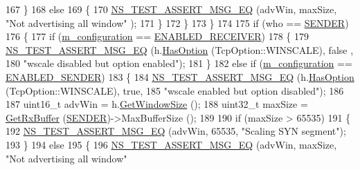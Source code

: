 \begin{DoxyCode}
167                 \}
168               \textcolor{keywordflow}{else}
169                 \{
170                   \hyperlink{group__testing_ga2a9d78cffb3db8e867c35fff0b698cf5}{NS\_TEST\_ASSERT\_MSG\_EQ} (advWin, maxSize, \textcolor{stringliteral}{"Not advertising all window"}
      );
171                 \}
172             \}
173         \}
174 
175       \textcolor{keywordflow}{if} (who == \hyperlink{classns3_1_1TcpGeneralTest_a29338e6b7137cad650c2ff835713f6eea5400e3d6b26928cf9e67ebb026462256}{SENDER})
176         \{
177           \textcolor{keywordflow}{if} (\hyperlink{classWScalingTestCase_a72831e1b3b682abc7055beee2e0022c1}{m\_configuration} == \hyperlink{classWScalingTestCase_a6b31fa8be505eaac47c2383fb17dc5fda2019990e4d73c728a156c14570c9feef}{ENABLED\_RECEIVER})
178             \{
179               \hyperlink{group__testing_ga2a9d78cffb3db8e867c35fff0b698cf5}{NS\_TEST\_ASSERT\_MSG\_EQ} (h.\hyperlink{classns3_1_1TcpHeader_aacc07bdab91925f1cddf9bcb1ae91d13}{HasOption} (TcpOption::WINSCALE), \textcolor{keyword}{false}
      ,
180                                      \textcolor{stringliteral}{"wscale disabled but option enabled"});
181             \}
182           \textcolor{keywordflow}{else} \textcolor{keywordflow}{if} (\hyperlink{classWScalingTestCase_a72831e1b3b682abc7055beee2e0022c1}{m\_configuration} == \hyperlink{classWScalingTestCase_a6b31fa8be505eaac47c2383fb17dc5fda605d0a930221d4226dfee3e4c89b47a3}{ENABLED\_SENDER})
183             \{
184               \hyperlink{group__testing_ga2a9d78cffb3db8e867c35fff0b698cf5}{NS\_TEST\_ASSERT\_MSG\_EQ} (h.\hyperlink{classns3_1_1TcpHeader_aacc07bdab91925f1cddf9bcb1ae91d13}{HasOption} (TcpOption::WINSCALE), \textcolor{keyword}{true},
185                                      \textcolor{stringliteral}{"wscale enabled but option disabled"});
186 
187               uint16\_t advWin = h.\hyperlink{classns3_1_1TcpHeader_aa6adcd54e5b13941acdf6328cecc9b29}{GetWindowSize} ();
188               uint32\_t maxSize = \hyperlink{classns3_1_1TcpGeneralTest_a9e695c4490162fcfb837c9a8f4ec18d5}{GetRxBuffer} (\hyperlink{classns3_1_1TcpGeneralTest_a29338e6b7137cad650c2ff835713f6eea5400e3d6b26928cf9e67ebb026462256}{SENDER})->MaxBufferSize ();
189 
190               \textcolor{keywordflow}{if} (maxSize > 65535)
191                 \{
192                   \hyperlink{group__testing_ga2a9d78cffb3db8e867c35fff0b698cf5}{NS\_TEST\_ASSERT\_MSG\_EQ} (advWin, 65535, \textcolor{stringliteral}{"Scaling SYN segment"});
193                 \}
194               \textcolor{keywordflow}{else}
195                 \{
196                   \hyperlink{group__testing_ga2a9d78cffb3db8e867c35fff0b698cf5}{NS\_TEST\_ASSERT\_MSG\_EQ} (advWin, maxSize, \textcolor{stringliteral}{"Not advertising all window"}

\end{DoxyCode}

